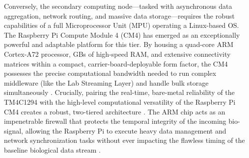 Conversely, the secondary computing node—tasked with asynchronous data aggregation, network routing, and massive data storage—requires the robust capabilities of a full Microprocessor Unit (MPU) operating a Linux-based OS. The Raspberry Pi Compute Module 4 (CM4) \cite{raspberrypi_cm4} has emerged as an exceptionally powerful and adaptable platform for this tier. By housing a quad-core ARM Cortex-A72 processor, GBs of high-speed RAM, and extensive connectivity matrices within a compact, carrier-board-deployable form factor, the CM4 possesses the precise computational bandwidth needed to run complex middleware (like the Lab Streaming Layer) and handle bulk storage simultaneously \cite{Totev2023}. Crucially, pairing the real-time, bare-metal reliability of the TM4C1294 with the high-level computational versatility of the Raspberry Pi CM4 creates a robust, two-tiered architecture \cite{pinho2014wireless}. The ARM chip acts as an impenetrable firewall that protects the temporal integrity of the incoming bio-signal, allowing the Raspberry Pi to execute heavy data management and network synchronization tasks without ever impacting the flawless timing of the baseline biological data stream \cite{xie2022fpga}.
